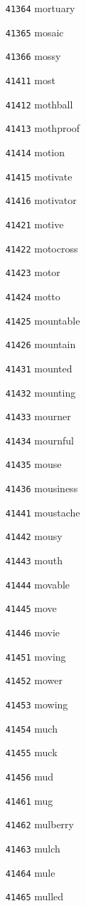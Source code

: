 \documentclass[twoside,11pt]{article}
\begin{document}
\begin{multicols}{5}
\begin{enumerate}
\item[\texttt{41364}] mortuary
\item[\texttt{41365}] mosaic
\item[\texttt{41366}] mossy
\item[\texttt{41411}] most
\item[\texttt{41412}] mothball
\item[\texttt{41413}] mothproof
\item[\texttt{41414}] motion
\item[\texttt{41415}] motivate
\item[\texttt{41416}] motivator
\item[\texttt{41421}] motive
\item[\texttt{41422}] motocross
\item[\texttt{41423}] motor
\item[\texttt{41424}] motto
\item[\texttt{41425}] mountable
\item[\texttt{41426}] mountain
\item[\texttt{41431}] mounted
\item[\texttt{41432}] mounting
\item[\texttt{41433}] mourner
\item[\texttt{41434}] mournful
\item[\texttt{41435}] mouse
\item[\texttt{41436}] mousiness
\item[\texttt{41441}] moustache
\item[\texttt{41442}] mousy
\item[\texttt{41443}] mouth
\item[\texttt{41444}] movable
\item[\texttt{41445}] move
\item[\texttt{41446}] movie
\item[\texttt{41451}] moving
\item[\texttt{41452}] mower
\item[\texttt{41453}] mowing
\item[\texttt{41454}] much
\item[\texttt{41455}] muck
\item[\texttt{41456}] mud
\item[\texttt{41461}] mug
\item[\texttt{41462}] mulberry
\item[\texttt{41463}] mulch
\item[\texttt{41464}] mule
\item[\texttt{41465}] mulled

\end{enumerate}
\end{multicols}
\end{document}
